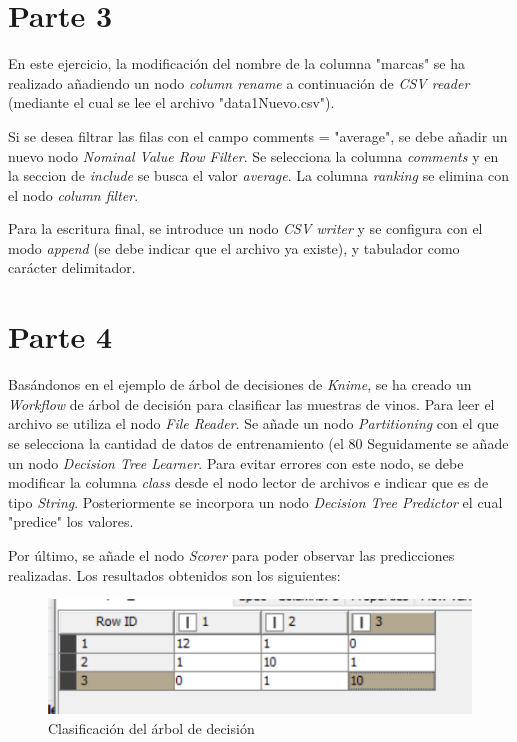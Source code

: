 \documentclass[10pt,a4paper]{article}
\begin{document}
\begin{itemize}
\section{Parte 3}
En este ejercicio, la modificación del nombre de la columna "marcas" se ha realizado añadiendo un nodo \textit{column rename} a continuación de \textit{CSV reader} (mediante el cual se lee el archivo "data1Nuevo.csv").  \par
Si se desea filtrar las filas con el campo comments = "average", se debe añadir un nuevo nodo \textit{Nominal Value Row Filter}. Se selecciona la columna \textit{comments} y en la seccion de \textit{include} se busca el valor \textit{average}. La columna \textit{ranking} se elimina con el nodo \textit{column filter}.  

Para la escritura final, se introduce un nodo \textit{CSV writer} y se configura con el modo \textit{append} (se debe indicar que el archivo ya existe), y tabulador como carácter delimitador.

\section{Parte 4}
Basándonos en el ejemplo de árbol de decisiones de \textit{Knime}, se ha creado un \textit{Workflow} de árbol de decisión para clasificar las muestras de vinos. 
Para leer el archivo se utiliza el nodo \textit{File Reader}. Se añade un nodo \textit{Partitioning} con el que se selecciona la cantidad de datos de entrenamiento (el 80%
Seguidamente se añade un nodo \textit{Decision Tree Learner}. Para evitar errores con este nodo, se debe modificar la columna \textit{class} desde el nodo lector de archivos e indicar que es de tipo \textit{String}. Posteriormente se incorpora un nodo \textit{Decision Tree Predictor} el cual "predice" los valores.\par
Por último, se añade el nodo \textit{Scorer} para poder observar las predicciones realizadas. Los resultados obtenidos son los siguientes:
\begin{figure}[h!]
	\centering
	\includegraphics[scale=0.7]{prediction.png}
	\caption{Clasificación del árbol de decisión}
	\label{fig:prediction} 
\end{figure}
\end{itemize}
\end{document}
